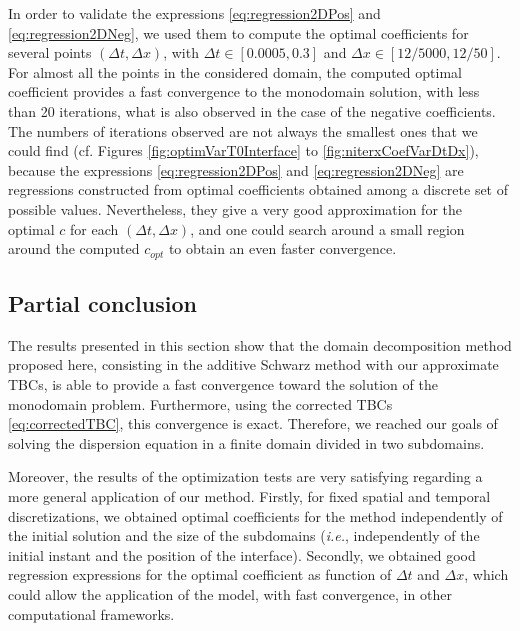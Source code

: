\indent In order to validate the expressions \eqref{eq:regression2DPos} and \eqref{eq:regression2DNeg}, we used them to compute the optimal coefficients for several points $(\Delta t, \Delta x)$, with $\Delta t \in [0.0005,0.3]$ and $\Delta x \in \left[ 12/5000,12/50\right]$. For almost all the points in the considered domain, the computed optimal coefficient provides a fast convergence to the monodomain solution, with less than 20 iterations, what is also observed in the case of the negative coefficients. The numbers of iterations observed are not always the smallest ones that we could find (cf. Figures \ref{fig:optimVarT0Interface} to \ref{fig:niterxCoefVarDtDx}), because the expressions \eqref{eq:regression2DPos} and \eqref{eq:regression2DNeg} are regressions constructed from optimal coefficients obtained among a discrete set of possible values. Nevertheless, they give a very good approximation for the optimal $c$ for each $(\Delta t, \Delta x)$, and one could search around a small region around the computed $c_{opt}$ to obtain an even faster convergence.




\subsection{Partial conclusion}
 
\indent The results presented in this section show that the domain decomposition method proposed here, consisting in the additive Schwarz method with our approximate TBCs, is able to provide a fast convergence toward the solution of the monodomain problem. Furthermore, using the corrected TBCs \eqref{eq:correctedTBC}, this convergence is exact. Therefore, we reached our goals of solving the dispersion equation in a finite domain divided in two subdomains.

\indent Moreover, the results of the optimization tests are very satisfying regarding a more general application of our method. Firstly, for fixed spatial and temporal discretizations, we obtained optimal coefficients for the method independently of the initial solution and the size of the subdomains (\emph{i.e.}, independently of the initial instant and the position of the interface). Secondly, we obtained good regression expressions for the optimal coefficient as function of $\Delta t$ and $\Delta x$, which could allow the application of the model, with fast convergence, in other computational frameworks.














